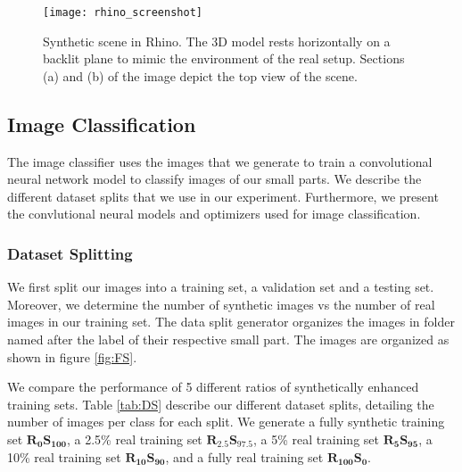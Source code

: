 \begin{figure}[H]
\centering
  \texttt{[image: rhino\_screenshot]}
\caption{Synthetic scene in Rhino. The 3D model rests horizontally on a backlit plane to mimic the environment of the real setup. Sections (a) and (b) of the image depict the top view of the scene.}
\label{fig:RhinoScreenshot}
\end{figure}

\subsection{Image Classification}

The image classifier uses the images that we generate to train a convolutional neural network model to classify images of our small parts. We describe the different dataset splits that we use in our experiment. Furthermore, we present the convlutional neural models and optimizers used for image classification.

\subsubsection{Dataset Splitting}
We first split our images into a training set, a validation set and a testing set. Moreover, we determine the number of synthetic images vs the number of real images in our training set. The data split generator organizes the images in folder named after the label of their respective small part. The images are organized as shown in figure \ref{fig:FS}.

We compare the performance of 5 different ratios of synthetically enhanced training sets. Table \ref{tab:DS} describe our different dataset splits, detailing the number of images per class for each split. We generate a fully synthetic training set $\boldsymbol{R_{0}S_{100}}$, a 2.5\% real training set $\boldsymbol{R_{2.5}S_{97.5}}$, a 5\% real training set $\boldsymbol{R_{5}S_{95}}$, a 10\% real training set $\boldsymbol{R_{10}S_{90}}$, and a fully real training set $\boldsymbol{R_{100}S_{0}}$. 

